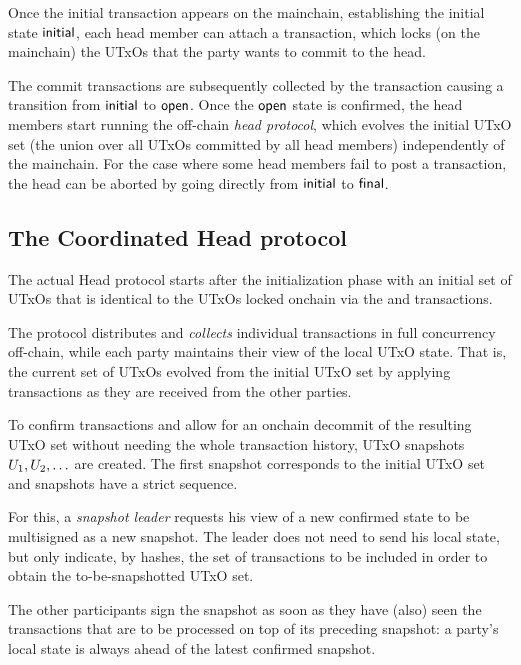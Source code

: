 

Once the initial transaction appears on the mainchain, establishing the initial
state $\mathsf{initial}$, each head member can attach a \mtxCom{} transaction, which
locks (on the mainchain) the UTxOs that the party wants to commit to the head.

The commit transactions are subsequently collected by the \mtxCCom{} transaction
causing a transition from $\mathsf{initial}$ to $\mathsf{open}$. Once the $\mathsf{open}$ state is
confirmed, the head members start running the off-chain \emph{head protocol},
which evolves the initial UTxO set (the union over all UTxOs committed by all
head members) independently of the mainchain. For the case where some head
members fail to post a \mtxCom{} transaction, the head can be aborted by going
directly from $\mathsf{initial}$ to $\mathsf{final}$.

\subsection{The Coordinated Head protocol}

The actual Head protocol starts after the initialization phase with an initial
set of UTxOs that is identical to the UTxOs locked onchain via the \mtxCom{}
and \mtxCCom{} transactions.

The protocol distributes and \emph{collects} individual transactions in full
concurrency off-chain, while each party maintains their view of the local UTxO
state. That is, the current set of UTxOs evolved from the initial UTxO set by
applying transactions as they are received from the other parties.

To confirm transactions and allow for an onchain decommit of the resulting UTxO
set without needing the whole transaction history, UTxO snapshots
$U_1,U_2,\ldots$ are created. The first snapshot corresponds to the
initial UTxO set and snapshots have a strict sequence.

For this, a \emph{snapshot leader} requests his view of a new confirmed state to
be multisigned as a new snapshot. The leader does not need to send his local
state, but only indicate, by hashes, the set of transactions to be included in
order to obtain the to-be-snapshotted UTxO set.

The other participants sign the snapshot as soon as they have (also) seen the
transactions that are to be processed on top of its preceding snapshot: a
party's local state is always ahead of the latest confirmed snapshot.

